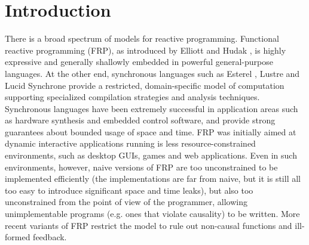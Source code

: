 \documentclass[nocopyrightspace,preprint]{sigplanconf}
\begin{document}
\section{Introduction}

There is a broad spectrum of models for reactive programming.
Functional reactive programming (FRP), as introduced by Elliott and
Hudak \cite{fran}, is highly expressive and generally shallowly
embedded in powerful general-purpose languages.  At the other end,
synchronous languages such as Esterel \cite{esterel}, Lustre
\cite{lustre} and Lucid Synchrone \cite{synchrone} provide a
restricted, domain-specific model of computation supporting
specialized compilation strategies and analysis
techniques. Synchronous languages have been extremely successful in
application areas such as hardware synthesis and embedded control
software, and provide strong guarantees about bounded usage of space
and time. FRP was initially aimed at dynamic interactive applications
running is less resource-constrained environments, such as desktop
GUIs, games and web applications. Even in such environments, however,
naive versions of FRP are too unconstrained to be implemented
efficiently (the implementations are far from naive, but it is still
all too easy to introduce significant space and time leaks), but also
too unconstrained from the point of view of the programmer, allowing
unimplementable programs (e.g. ones that violate causality) to be
written. More recent variants of FRP \cite{liu:cca,sculthorpe:safefrp}
restrict the model to rule out non-causal functions and ill-formed
feedback.
\end{document}

